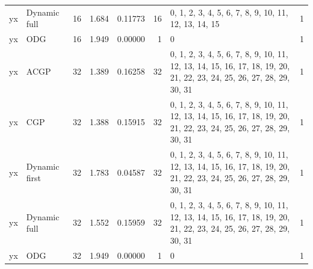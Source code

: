 \documentclass[10pt,a4paper]{article}
\begin{document}
\begin{longtable}{@{}p{23mm}p{29mm}rrrrp{36mm}r@{}}
yx & Dynamic full & 16 & 1.684 & 0.11773 & 16 & 0, 1, 2, 3, 4, 5, 6, 7, 8, 9, 10, 11, 12, 13, 14, 15 & 1 \\
yx & ODG & 16 & 1.949 & 0.00000 & 1 & 0 & 1 \\
yx & ACGP & 32 & 1.389 & 0.16258 & 32 & 0, 1, 2, 3, 4, 5, 6, 7, 8, 9, 10, 11, 12, 13, 14, 15, 16, 17, 18, 19, 20, 21, 22, 23, 24, 25, 26, 27, 28, 29, 30, 31 & 1 \\
yx & CGP & 32 & 1.388 & 0.15915 & 32 & 0, 1, 2, 3, 4, 5, 6, 7, 8, 9, 10, 11, 12, 13, 14, 15, 16, 17, 18, 19, 20, 21, 22, 23, 24, 25, 26, 27, 28, 29, 30, 31 & 1 \\
yx & Dynamic first & 32 & 1.783 & 0.04587 & 32 & 0, 1, 2, 3, 4, 5, 6, 7, 8, 9, 10, 11, 12, 13, 14, 15, 16, 17, 18, 19, 20, 21, 22, 23, 24, 25, 26, 27, 28, 29, 30, 31 & 1 \\
yx & Dynamic full & 32 & 1.552 & 0.15959 & 32 & 0, 1, 2, 3, 4, 5, 6, 7, 8, 9, 10, 11, 12, 13, 14, 15, 16, 17, 18, 19, 20, 21, 22, 23, 24, 25, 26, 27, 28, 29, 30, 31 & 1 \\
yx & ODG & 32 & 1.949 & 0.00000 & 1 & 0 & 1 \\
\end{longtable}\normalsize\setlength{\tabcolsep}{6pt}
\clearpage
\end{document}
